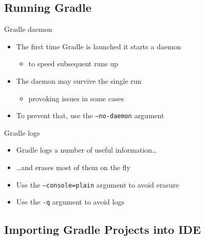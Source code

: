 \documentclass[presentation]{beamer}\mode<presentation>{\usetheme{AMSBolognaFC}}
\begin{document}
\subsection{Running Gradle}

\begin{frame}

    \begin{block}{Gradle daemon}
        \begin{itemize}
            \item The first time Gradle is launched it starts a daemon
            \begin{itemize}
                \item to speed subsequent runs up
            \end{itemize}
            \item The daemon may survive the single run
            \begin{itemize}
                \item provoking issues in some cases
            \end{itemize}
            \item To prevent that, use the \alert{\texttt{--no-daemon}} argument
        \end{itemize}
    \end{block}

    \begin{block}{Gradle logs}
        \begin{itemize}
            \item Gradle logs a number of useful information\ldots
            \item \ldots and erases most of them on the fly
            \item Use the \alert{\texttt{--console=plain}} argument to avoid erasure
            \item Use the \alert{\texttt{-q}} argument to avoid logs
        \end{itemize}
    \end{block}
\end{frame}

\subsection{Importing Gradle Projects into IDE}
\end{document}
